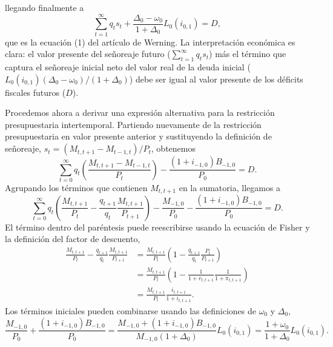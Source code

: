 \documentclass[../../entrega.tex]{subfiles}
\begin{document}
llegando finalmente a
\begin{equation}
    \sum_{t=1}^{\infty} q_t s_t + \frac{\Delta_0 - \omega_0}{1 + \Delta_0}L_0(i_{0,1}) = D,
\end{equation}
que es la ecuación (1) del artículo de Werning.
La interpretación económica es clara: el valor presente del señoreaje futuro ($\sum_{t=1}^{\infty} q_t s_t$) más el término que captura el señoreaje inicial neto del valor real de la deuda inicial ($L_0(i_{0,1})(\Delta_0 - \omega_0)/(1 + \Delta_0)$) debe ser igual al valor presente de los déficits fiscales futuros ($D$).

Procedemos ahora a derivar una expresión alternativa para la restricción presupuestaria intertemporal.
Partiendo nuevamente de la restricción presupuestaria en valor presente anterior y sustituyendo la definición de señoreaje, $s_t = (M_{t,t+1} - M_{t-1,t})/P_t$, obtenemos
\begin{equation}
    \sum_{t=0}^{\infty} q_t \left(\frac{M_{t,t+1} - M_{t-1,t}}{P_t}\right) - \frac{(1 + i_{-1,0})B_{-1,0}}{P_0} = D.
\end{equation}
Agrupando los términos que contienen $M_{t,t+1}$ en la sumatoria, llegamos a
\begin{equation}
    \sum_{t=0}^{\infty} q_t \left(\frac{M_{t,t+1}}{P_t} - \frac{q_{t+1}}{q_t}\frac{M_{t,t+1}}{P_{t+1}}\right) - \frac{M_{-1,0}}{P_0} - \frac{(1 + i_{-1,0})B_{-1,0}}{P_0} = D.
\end{equation}
El término dentro del paréntesis puede reescribirse usando la ecuación de Fisher y la definición del factor de descuento,
\begin{align*}
    \frac{M_{t,t+1}}{P_t} - \frac{q_{t+1}}{q_t}\frac{M_{t,t+1}}{P_{t+1}} & = \frac{M_{t,t+1}}{P_t}\left(1 - \frac{q_{t+1}}{q_t}\frac{P_t}{P_{t+1}}\right)           \\
                                                                         & = \frac{M_{t,t+1}}{P_t}\left(1 - \frac{1}{1 + r_{t,t+1}}\frac{1}{1 + \pi_{t,t+1}}\right) \\
                                                                         & = \frac{M_{t,t+1}}{P_t}\frac{i_{t,t+1}}{1 + i_{t,t+1}}.
\end{align*}
Los términos iniciales pueden combinarse usando las definiciones de $\omega_0$ y $\Delta_0$,
\begin{equation}
    \frac{M_{-1,0}}{P_0} + \frac{(1 + i_{-1,0})B_{-1,0}}{P_0} = \frac{M_{-1,0} + (1 + i_{-1,0})B_{-1,0}}{M_{-1,0}(1 + \Delta_0)}L_0(i_{0,1}) = \frac{1 + \omega_0}{1 + \Delta_0}L_0(i_{0,1}).
\end{equation}
\end{document}
